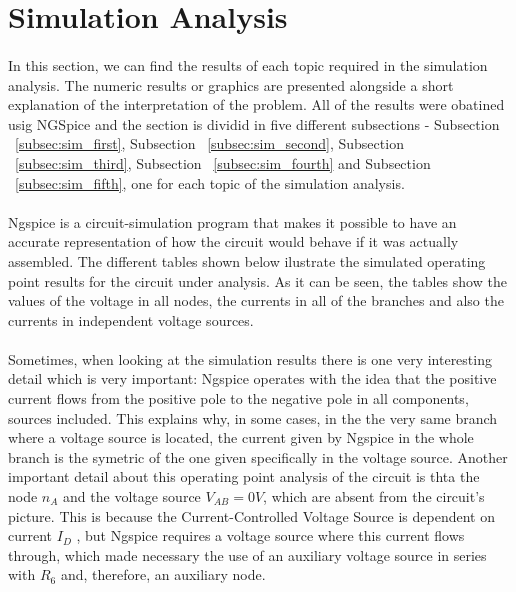 \section{Simulation Analysis}
\label{sec:simulation}

\paragraph{}
In this section, we can find the results of each topic required in the simulation analysis. The numeric results or graphics are presented alongside a short explanation of the interpretation of the problem. All of the results were obatined usig NGSpice and the section is dividid in five different subsections - Subsection ~\ref{subsec:sim_first}, Subsection ~\ref{subsec:sim_second}, Subsection ~\ref{subsec:sim_third}, Subsection ~\ref{subsec:sim_fourth} and Subsection ~\ref{subsec:sim_fifth}, one for each topic of the simulation analysis.

\paragraph{}
Ngspice is a circuit-simulation program that makes it possible to have an accurate representation of how the circuit would behave if it was actually assembled. The different tables shown below ilustrate the simulated operating point results for the circuit under analysis. As it can be seen, the tables show the values of the voltage in all nodes, the currents in all of the branches and also the currents in independent voltage sources.

\paragraph{}
Sometimes, when looking at the simulation results there is one very interesting detail which is very important: Ngspice operates with the idea that the positive current flows from the positive pole to the negative pole in all components, sources included. This explains why, in some cases, in the the very same branch where a voltage source is located, the current given by Ngspice in the whole branch is the symetric of the one given specifically in the voltage source. Another important detail about this operating point analysis of the circuit is thta the node $n_A$ and the voltage source $V_{AB} = 0V$, which are absent from the circuit’s picture. This is because the Current-Controlled Voltage Source is dependent on current $I_D$ , but Ngspice requires a voltage source where this current flows through, which made necessary the use of an auxiliary voltage source in series with $R_6$ and, therefore, an auxiliary node.


